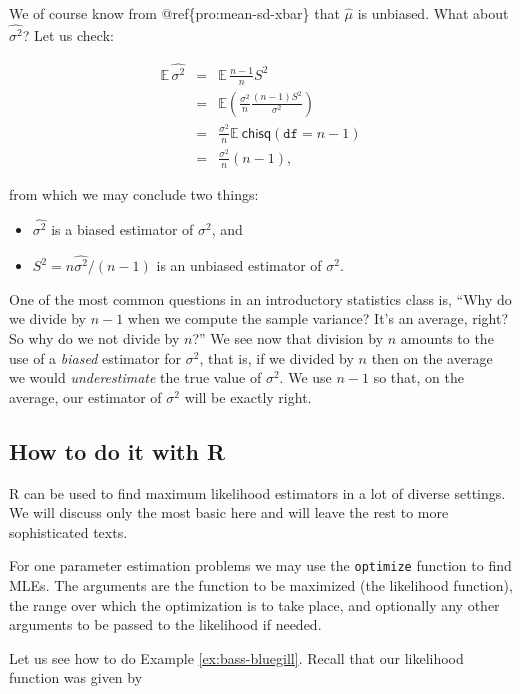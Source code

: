 \documentclass[]{book}
\providecommand{\tightlist}{%
  \setlength{\itemsep}{0pt}\setlength{\parskip}{0pt}}
\numberwithin{equation}{chapter}
\numberwithin{figure}{chapter}
\theoremstyle{plain}
\theoremstyle{definition}
\theoremstyle{remark}
\theoremstyle{definition}
\theoremstyle{definition}
\theoremstyle{remark}
\begin{document}
We of course know from @ref\{pro:mean-sd-xbar\} that \(\hat{\mu}\) is
unbiased. What about \(\hat{\sigma^{2}}\)? Let us check:

\begin{eqnarray*}
\mathbb{E}\,\hat{\sigma^{2}} & = & \mathbb{E}\,\frac{n-1}{n}S^{2}\\
 & = & \mathbb{E}\left(\frac{\sigma^{2}}{n}\frac{(n-1)S^{2}}{\sigma^{2}}\right)\\
 & = & \frac{\sigma^{2}}{n}\mathbb{E}\ \mathsf{chisq}(\mathtt{df}=n-1)\\
 & = & \frac{\sigma^{2}}{n}(n-1),
\end{eqnarray*}

from which we may conclude two things:

\begin{itemize}
\tightlist
\item
  \(\hat{\sigma^{2}}\) is a biased estimator of \(\sigma^{2}\), and
\item
  \(S^{2}=n\hat{\sigma^{2}}/(n-1)\) is an unbiased estimator of
  \(\sigma^{2}\).
\end{itemize}

One of the most common questions in an introductory statistics class is,
``Why do we divide by \(n-1\) when we compute the sample variance? It's
an average, right? So why do we not divide by \(n\)?'' We see now that
division by \(n\) amounts to the use of a \emph{biased} estimator for
\(\sigma^{2}\), that is, if we divided by \(n\) then on the average we
would \emph{underestimate} the true value of \(\sigma^{2}\). We use
\(n-1\) so that, on the average, our estimator of \(\sigma^{2}\) will be
exactly right.

\subsection{How to do it with R}\label{how-to-do-it-with-r-33}

R can be used to find maximum likelihood estimators in a lot of diverse
settings. We will discuss only the most basic here and will leave the
rest to more sophisticated texts.

For one parameter estimation problems we may use the \texttt{optimize}
function to find MLEs. The arguments are the function to be maximized
(the likelihood function), the range over which the optimization is to
take place, and optionally any other arguments to be passed to the
likelihood if needed.

Let us see how to do Example \ref{ex:bass-bluegill}. Recall that our
likelihood function was given by
\end{document}
